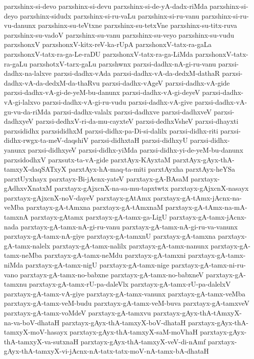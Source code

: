 {parxshinx-si-devo
parxshinx-si-devu
parxshinx-si-de-yA-dadx-riMda
parxshinx-si-deyo
parxshinx-sidudx
parxshinx-si-ru-vaLu
parxshinx-si-ru-vanu
parxshinx-si-ru-vu-danunx
parxshinx-su-teVtxne
parxshinx-su-tetxVne
parxshinx-su-titx-ruva
parxshinx-su-vadoV
parxshinx-su-vanu
parxshinx-su-veyo
parxshinx-su-vudu
parxshonxV
parxshonxV-kitx-reV-ka-rUpA
parxshonxV-tatx-ra-gaLa
parxshonxV-tatx-ra-ga-Le-raDU
parxshonxV-tatx-ra-ga-LiMda
parxshonxV-tatx-ra-gaLu
parxshotxV-tarx-gaLu
parxshwnx
parxsi-dadhx-nA-gi-ru-vanu
parxsi-dadhx-na-lalxve
parxsi-dadhx-vAda
parxsi-dadhx-vA-da-dedxM-dathaR
parxsi-dadhx-vA-da-dedxM-da-thaRvu
parxsi-dadhx-vAgeV
parxsi-dadhx-vA-gide
parxsi-dadhx-vA-gi-de-yeM-bu-danunx
parxsi-dadhx-vA-gi-deyeV
parxsi-dadhx-vA-gi-lalxvo
parxsi-dadhx-vA-gi-ru-vudu
parxsi-dadhx-vA-give
parxsi-dadhx-vA-gu-vu-da-riMda
parxsi-dadhx-valalx
parxsi-dadhxve
parxsi-dadhxveV
parxsi-dadhxyeV
parxsi-dedhxV-ri-da-mu-cayxteV
parxsi-dedhxVsheV
parxsi-dhayxti
parxsididhx
parxsididhxM
parxsi-didhx-pa-Di-si-dalilx
parxsi-didhx-riti
parxsi-didhx-rwgx-ta-meV-daqshiV
parxsi-didhxtaH
parxsi-didhxyU
parxsi-didhx-yanunx
parxsi-didhxyeV
parxsi-didhx-yiMda
parxsi-didhx-yi-de-yeM-bu-danunx
parxsidodhxV
parxsutx-ta-vA-gide
parxtAyx-KAyxtaM
parxtAyx-gAyx-thA-tamxyX-daqSATxyX
parxtAyx-hA-maq-ta-miti
parxtAyxha
parxtAyx-heYSa
parxtUyxhayx
parxtayx-Bi-jAcnx-yateV
parxtayx-gA-BAsaM
parxtayx-gAdhxvXnatxM
parxtayx-gAjxcnX-na-sa-mu-tapxtwtx
parxtayx-gAjxcnX-nasayx
parxtayx-gAjxcnX-noV-dayeV
parxtayx-gAtAmx
parxtayx-gA-tAmx-jAcnx-na-veMba
parxtayx-gA-tAmxna
parxtayx-gA-tAmxnaM
parxtayx-gA-tAmx-na-mA-tamxnA
parxtayx-gAtamx
parxtayx-gA-tamx-ga-LigU
parxtayx-gA-tamx-jAcnx-nada
parxtayx-gA-tamx-nA-gi-ru-vanu
parxtayx-gA-tamx-nA-gi-ru-va-vanunx
parxtayx-gA-tamx-nA-giye
parxtayx-gA-tamxnU
parxtayx-gA-tamxna
parxtayx-gA-tamx-nalelx
parxtayx-gA-tamx-nalilx
parxtayx-gA-tamx-nanunx
parxtayx-gA-tamx-neMba
parxtayx-gA-tamx-neMdu
parxtayx-gA-tamxni
parxtayx-gA-tamx-niMda
parxtayx-gA-tamx-nigU
parxtayx-gA-tamx-nige
parxtayx-gA-tamx-ni-ru-vano
parxtayx-gA-tamx-no-babxne
parxtayx-gA-tamx-no-babxneV
parxtayx-gA-tamxnu
parxtayx-gA-tamx-rU-pa-daleVlx
parxtayx-gA-tamx-rU-pa-dalelxV
parxtayx-gA-tamx-vA-giye
parxtayx-gA-tamx-vanunx
parxtayx-gA-tamx-veMba
parxtayx-gA-tamx-veM-budu
parxtayx-gA-tamx-veM-buva
parxtayx-gA-tamxveV
parxtayx-gA-tamx-voMdeV
parxtayx-gA-tamxvu
parxtayx-gAyx-thA-tAmxyX-na-va-boV-dhataH
parxtayx-gAyx-thA-tamxyX-boV-dhataH
parxtayx-gAyx-thA-tamxyX-moV-hasayx
parxtayx-gAyx-thA-tamxyX-saM-moVhaH
parxtayx-gAyx-thA-tamxyX-va-sutxnaH
parxtayx-gAyx-thA-tamxyX-veV-di-nAmf
parxtayx-gAyx-thA-tamxyX-vi-jAcnx-nA-tatx-tatx-moV-nA-tamx-bA-dhataH
}
